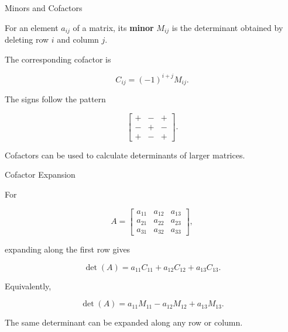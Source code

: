 \begin{frame}{Minors and Cofactors}

For an element $a_{ij}$ of a matrix, its \textbf{minor}
$M_{ij}$ is the determinant obtained by deleting row $i$
and column $j$.

\vspace{0.4cm}

The corresponding cofactor is

\[
\boxed{
C_{ij}=(-1)^{i+j}M_{ij}.
}
\]

\vspace{0.4cm}

The signs follow the pattern

\[
\begin{bmatrix}
+&-&+\\
-&+&-\\
+&-&+
\end{bmatrix}.
\]

\vspace{0.3cm}

Cofactors can be used to calculate determinants of larger matrices.

\end{frame}



\begin{frame}{Cofactor Expansion}

For

\[
A=
\begin{bmatrix}
a_{11}&a_{12}&a_{13}\\
a_{21}&a_{22}&a_{23}\\
a_{31}&a_{32}&a_{33}
\end{bmatrix},
\]

expanding along the first row gives

\[
\boxed{
\det(A)
=
a_{11}C_{11}
+
a_{12}C_{12}
+
a_{13}C_{13}.
}
\]

\vspace{0.4cm}

Equivalently,

\[
\det(A)
=
a_{11}M_{11}
-a_{12}M_{12}
+a_{13}M_{13}.
\]

\vspace{0.3cm}

The same determinant can be expanded along any row or column.

\end{frame}


